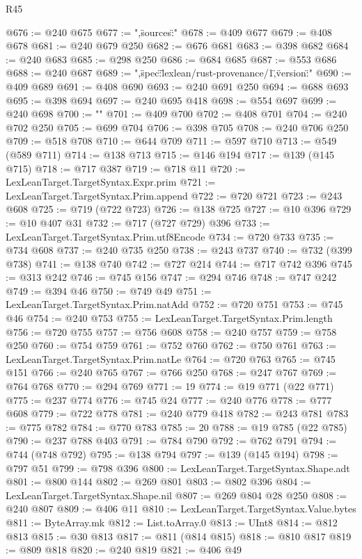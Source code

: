 \begin{lexlean}{R45}
\begin{coremodule}
{@676 := @240 @675
@677 := ",\"sources\":"
@678 := @409 @677
@679 := @408 @678
@681 := @240 @679 @250
@682 := @676 @681
@683 := @398 @682
@684 := @240 @683
@685 := @298 @250
@686 := @684 @685
@687 := @553 @686
@688 := @240 @687
@689 := ",\"spec\":\"lexlean/rust-provenance/1\",\"version\":"
@690 := @409 @689
@691 := @408 @690
@693 := @240 @691 @250
@694 := @688 @693
@695 := @398 @694
@697 := @240 @695 @418
@698 := @554 @697
@699 := @240 @698
@700 := "}\n"
@701 := @409 @700
@702 := @408 @701
@704 := @240 @702 @250
@705 := @699 @704
@706 := @398 @705
@708 := @240 @706 @250
@709 := @518 @708
@710 := @644 @709
@711 := @597 @710
@713 := @549 (@589 @711)
@714 := @138 @713
@715 := @146 @194
@717 := @139 (@145 @715)
@718 := @717 @387
@719 := @718 @11
@720 := LexLeanTarget.TargetSyntax.Expr.prim
@721 := LexLeanTarget.TargetSyntax.Prim.append
@722 := @720 @721
@723 := @243 @608
@725 := @719 (@722 @723)
@726 := @138 @725
@727 := @10 @396
@729 := @10 @407 @31
@732 := @717 (@727 @729) @396
@733 := LexLeanTarget.TargetSyntax.Prim.utf8Encode
@734 := @720 @733
@735 := @734 @608
@737 := @240 @735 @250
@738 := @243 @737
@740 := @732 (@399 @738)
@741 := @138 @740
@742 := @727 @214
@744 := @717 @742 @396
@745 := @313 @242
@746 := @745 @156
@747 := @294 @746
@748 := @747 @242
@749 := @394 @46
@750 := @749 @49
@751 := LexLeanTarget.TargetSyntax.Prim.natAdd
@752 := @720 @751
@753 := @745 @46
@754 := @240 @753
@755 := LexLeanTarget.TargetSyntax.Prim.length
@756 := @720 @755
@757 := @756 @608
@758 := @240 @757
@759 := @758 @250
@760 := @754 @759
@761 := @752 @760
@762 := @750 @761
@763 := LexLeanTarget.TargetSyntax.Prim.natLe
@764 := @720 @763
@765 := @745 @151
@766 := @240 @765
@767 := @766 @250
@768 := @247 @767
@769 := @764 @768
@770 := @294 @769
@771 := 19
@774 := @19 @771 (@22 @771)
@775 := @237 @774
@776 := @745 @24
@777 := @240 @776
@778 := @777 @608
@779 := @722 @778
@781 := @240 @779 @418
@782 := @243 @781
@783 := @775 @782
@784 := @770 @783
@785 := 20
@788 := @19 @785 (@22 @785)
@790 := @237 @788 @403
@791 := @784 @790
@792 := @762 @791
@794 := @744 (@748 @792)
@795 := @138 @794
@797 := @139 (@145 @194)
@798 := @797 @51
@799 := @798 @396
@800 := LexLeanTarget.TargetSyntax.Shape.adt
@801 := @800 @144
@802 := @269 @801
@803 := @802 @396
@804 := LexLeanTarget.TargetSyntax.Shape.nil
@807 := @269 @804 @28 @250
@808 := @240 @807
@809 := @406 @11
@810 := LexLeanTarget.TargetSyntax.Value.bytes
@811 := ByteArray.mk
@812 := List.toArray.{0}
@813 := UInt8
@814 := @812 @813
@815 := @30 @813
@817 := @811 (@814 @815)
@818 := @810 @817
@819 := @809 @818
@820 := @240 @819
@821 := @406 @49

\end{coremodule}
\end{lexlean}
